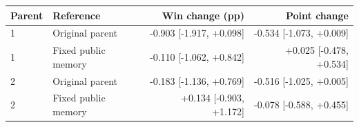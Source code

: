 \begin{tabular}{llrr}
\toprule
Parent & Reference & Win change (pp) & Point change \\
\midrule
1 & Original parent & -0.903 [-1.917, +0.098] & -0.534 [-1.073, +0.009] \\
1 & Fixed public memory & -0.110 [-1.062, +0.842] & +0.025 [-0.478, +0.534] \\
2 & Original parent & -0.183 [-1.136, +0.769] & -0.516 [-1.025, +0.005] \\
2 & Fixed public memory & +0.134 [-0.903, +1.172] & -0.078 [-0.588, +0.455] \\
\bottomrule
\end{tabular}
